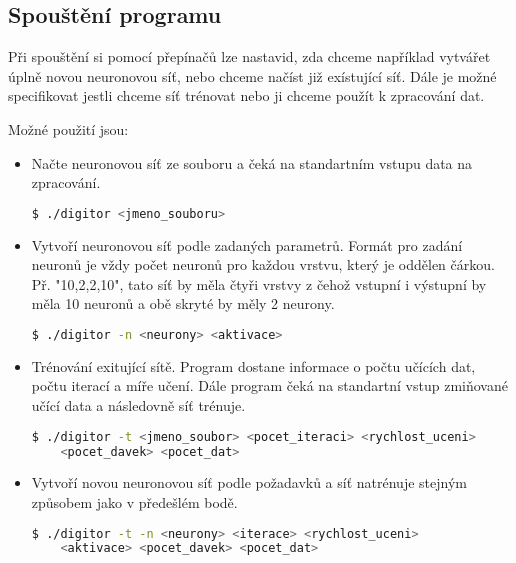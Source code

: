 \subsection{Spouštění programu}
Při spouštění si pomocí přepínačů lze nastavid, zda chceme například vytvářet úplně novou neuronovou síť, nebo chceme načíst již exístující síť.
Dále je možné specifikovat jestli chceme síť trénovat nebo ji chceme použít k zpracování dat.

Možné použití jsou:
\begin{itemize}
    \item Načte neuronovou síť ze souboru a čeká na standartním vstupu data na zpracování.
    \begin{lstlisting}[language=bash, backgroundcolor=\color{backcolor}]
 $ ./digitor <jmeno_souboru>
    \end{lstlisting}

    \item Vytvoří neuronovou síť podle zadaných parametrů.
    Formát pro zadání neuronů je vždy počet neuronů pro každou vrstvu, který je oddělen čárkou.
    Př. "10,2,2,10", tato síť by měla čtyři vrstvy z čehož vstupní i výstupní by měla 10 neuronů a obě skryté by měly 2 neurony.
    \begin{lstlisting}[language=bash, backgroundcolor=\color{backcolor}]
 $ ./digitor -n <neurony> <aktivace>
    \end{lstlisting}

    \item Trénování exitující sítě. Program dostane informace o počtu učících dat, počtu iterací a míře učení.
    Dále program čeká na standartní vstup zmiňované učící data a následovně síť trénuje.
    \begin{lstlisting}[language=bash, backgroundcolor=\color{backcolor}]
 $ ./digitor -t <jmeno_soubor> <pocet_iteraci> <rychlost_uceni>
    <pocet_davek> <pocet_dat>
    \end{lstlisting}

    \item Vytvoří novou neuronovou síť podle požadavků a síť natrénuje stejným způsobem jako v předešlém bodě.
    \begin{lstlisting}[language=bash, backgroundcolor=\color{backcolor}]
 $ ./digitor -t -n <neurony> <iterace> <rychlost_uceni>
    <aktivace> <pocet_davek> <pocet_dat>
    \end{lstlisting}
\end{itemize}
